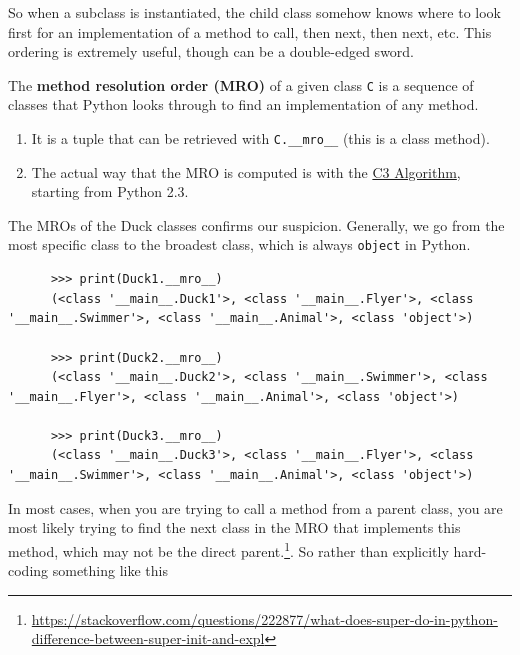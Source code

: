   So when a subclass is instantiated, the child class somehow knows where to look first for an implementation of a method to call, then next, then next, etc. This ordering is extremely useful, though can be a double-edged sword.   

  \begin{definition}
    \label{def:method-resolution-order}
    The \textbf{method resolution order (MRO)} of a given class \texttt{C} is a sequence of classes that Python looks through to find an implementation of any method. 
    \begin{enumerate}
      \item It is a tuple that can be retrieved with \texttt{C.\_\_mro\_\_} (this is a class method). 
      \item The actual way that the MRO is computed is with the \href{https://docs.python.org/3/howto/mro.html}{C3 Algorithm}, starting from Python 2.3.
    \end{enumerate}
  \end{definition}

  \begin{example}
    \label{ex:mros-of-ducks}
    The MROs of the Duck classes confirms our suspicion. Generally, we go from the most specific class to the broadest class, which is always \texttt{object} in Python. 

    \begin{lstlisting}
      >>> print(Duck1.__mro__)
      (<class '__main__.Duck1'>, <class '__main__.Flyer'>, <class '__main__.Swimmer'>, <class '__main__.Animal'>, <class 'object'>)

      >>> print(Duck2.__mro__)
      (<class '__main__.Duck2'>, <class '__main__.Swimmer'>, <class '__main__.Flyer'>, <class '__main__.Animal'>, <class 'object'>)

      >>> print(Duck3.__mro__)
      (<class '__main__.Duck3'>, <class '__main__.Flyer'>, <class '__main__.Swimmer'>, <class '__main__.Animal'>, <class 'object'>)
    \end{lstlisting}
  \end{example} 

  In most cases, when you are trying to call a method from a parent class, you are most likely trying to find the next class in the MRO that implements this method, which may not be the direct parent.\footnote{\href{https://stackoverflow.com/questions/222877/what-does-super-do-in-python-difference-between-super-init-and-expl}{https://stackoverflow.com/questions/222877/what-does-super-do-in-python-difference-between-super-init-and-expl}}. So rather than explicitly hard-coding something like this 

